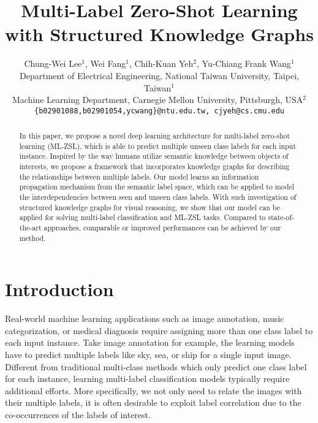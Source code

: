 \documentclass[10pt,twocolumn,letterpaper]{article}
\begin{document}
\title{Multi-Label Zero-Shot Learning with Structured Knowledge Graphs}
\author{Chung-Wei Lee${}^1$\footnotemark[1] , Wei Fang${}^1$\footnotemark[1] , Chih-Kuan Yeh${}^2$, Yu-Chiang Frank Wang${}^1$\\
Department of Electrical Engineering, National Taiwan University, Taipei, Taiwan${}^1$\\
Machine Learning Department, Carnegie Mellon University, Pittsburgh, USA${}^2$\\
{\tt \{b02901088,b02901054,ycwang\}@ntu.edu.tw, cjyeh@cs.cmu.edu}\\
}


\maketitle
\thispagestyle{empty}



\begin{abstract}
In this paper, we propose a novel deep learning architecture for multi-label zero-shot learning (ML-ZSL), which is able to predict multiple unseen class labels for each input instance. Inspired by the way humans utilize semantic knowledge between objects of interests, we propose a framework that incorporates knowledge graphs for describing the relationships between multiple labels. Our model learns an information propagation mechanism from the semantic label space, which can be applied to model the interdependencies between seen and unseen class labels. With such investigation of structured knowledge graphs for visual reasoning, we show that our model can be applied for solving multi-label classification and ML-ZSL tasks. Compared to state-of-the-art approaches, comparable or improved performances can be achieved by our method.
\end{abstract}


\section{Introduction}
Real-world machine learning applications such as image annotation, music categorization, or medical diagnosis require assigning more than one class label to each input instance. Take image annotation for example, the learning models have to predict multiple labels like sky, sea, or ship for a single input image. 
Different from traditional multi-class methods which only predict one class label for each instance, learning multi-label classification models typically require additional efforts. More specifically, we not only need to relate the images with their multiple labels, it is often desirable to exploit label correlation due to the co-occurrences of the labels of interest.
\end{document}
